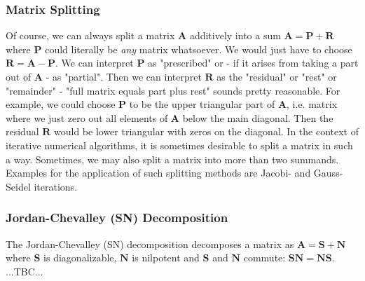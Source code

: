 \subsubsection{Matrix Splitting}
Of course, we can always split a matrix $\mathbf{A}$ additively into a sum $\mathbf{A} = \mathbf{P + R}$ where $\mathbf{P}$ could literally be \emph{any} matrix whatsoever. We would just have to choose $\mathbf{R} = \mathbf{A - P}$. We can interpret $\mathbf{P}$ as "prescribed" or - if it arises from taking a part out of $\mathbf{A}$ - as "partial". Then we can interpret $\mathbf{R}$ as the "residual" or "rest" or "remainder" - "full matrix equals part plus rest" sounds pretty reasonable. For example, we could choose $\mathbf{P}$ to be the upper triangular part of $\mathbf{A}$, i.e. matrix where we just zero out all elements of $\mathbf{A}$ below the main diagonal. Then the residual $\mathbf{R}$ would be lower triangular with zeros on the diagonal. In the context of iterative numerical algorithms, it is sometimes desirable to split a matrix in such a way. Sometimes, we may also split a matrix into more than two summands. Examples for the application of such splitting methods are Jacobi- and Gauss-Seidel iterations.




\subsubsection{Jordan-Chevalley (SN) Decomposition}
The Jordan-Chevalley (SN) decomposition decomposes a matrix as $\mathbf{A} =  \mathbf{S + N}$ where $\mathbf{S}$ is diagonalizable, $\mathbf{N}$ is nilpotent and $\mathbf{S}$ and $\mathbf{N}$ commute:
$\mathbf{SN} = \mathbf{NS}$. ...TBC...




